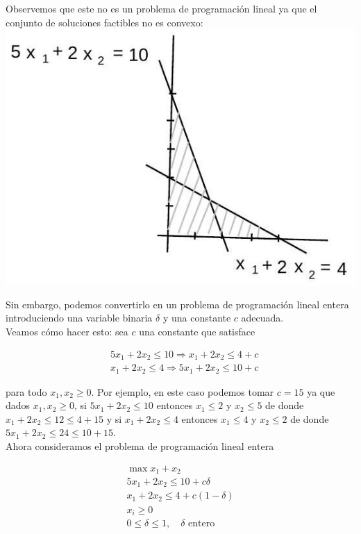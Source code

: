 \documentclass[10pt]{article}
\begin{document}
Observemos que este no es un problema de programación lineal ya que el conjunto de soluciones factibles no es convexo:\\
\includegraphics[max width=\textwidth, center]{2025_09_05_458e5b1ce89abceb5d44g-02}

Sin embargo, podemos convertirlo en un problema de programación lineal entera introduciendo una variable binaria $\delta$ y una constante $c$ adecuada.\\
Veamos cómo hacer esto: sea $c$ una constante que satisface

$$
\begin{aligned}
& 5 x_{1}+2 x_{2} \leq 10 \Longrightarrow x_{1}+2 x_{2} \leq 4+c \\
& x_{1}+2 x_{2} \leq 4 \Longrightarrow 5 x_{1}+2 x_{2} \leq 10+c
\end{aligned}
$$

para todo $x_{1}, x_{2} \geq 0$. Por ejemplo, en este caso podemos tomar $c=15$ ya que dados $x_{1}, x_{2} \geq 0$, si $5 x_{1}+2 x_{2} \leq 10$ entonces $x_{1} \leq 2$ y $x_{2} \leq 5$ de donde $x_{1}+2 x_{2} \leq 12 \leq 4+15$ y si $x_{1}+2 x_{2} \leq 4$ entonces $x_{1} \leq 4$ y $x_{2} \leq 2$ de donde $5 x_{1}+2 x_{2} \leq 24 \leq 10+15$.\\
Ahora consideramos el problema de programación lineal entera


\begin{gather*}
\max x_{1}+x_{2} \\
5 x_{1}+2 x_{2} \leq 10+c \delta \\
x_{1}+2 x_{2} \leq 4+c(1-\delta)  \tag{2}\\
x_{i} \geq 0 \\
0 \leq \delta \leq 1, \quad \delta \text { entero }
\end{gather*}
\end{document}
